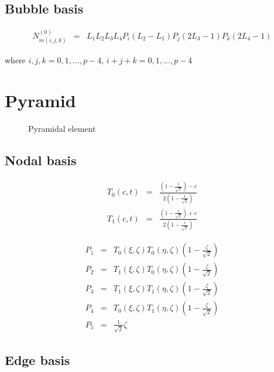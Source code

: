 \subsection{Bubble basis}

\begin{eqnarray*}
N_{m(i,j,k)}^{(0)}&=&L_1L_2L_3L_4P_i(L_2-L_1)P_j(2L_3-1)P_k(2L_4-1)
\end{eqnarray*}

\noindent where $i,j,k=0,1,\ldots,p-4$, $i+j+k=0,1,\ldots,p-4$ 

\section{Pyramid}

\begin{figure}[tbhp]
\begin{center}

\caption{Pyramidal element}
\end{center}
\end{figure}

\subsection{Nodal basis}

\begin{eqnarray*}
T_0(c,t)&=&\frac{(1-\frac{t}{\sqrt{2}})-c}{2(1-\frac{t}{\sqrt{2}})} \\
T_1(c,t)&=&\frac{(1-\frac{t}{\sqrt{2}})+c}{2(1-\frac{t}{\sqrt{2}})}
\end{eqnarray*}

\begin{eqnarray*}
P_1&=&T_0(\xi,\zeta)T_0(\eta,\zeta)(1-\frac{\zeta}{\sqrt{2}}) \\
P_2&=&T_1(\xi,\zeta)T_0(\eta,\zeta)(1-\frac{\zeta}{\sqrt{2}}) \\
P_3&=&T_1(\xi,\zeta)T_1(\eta,\zeta)(1-\frac{\zeta}{\sqrt{2}}) \\
P_4&=&T_0(\xi,\zeta)T_1(\eta,\zeta)(1-\frac{\zeta}{\sqrt{2}}) \\
P_5&=&\frac{1}{\sqrt{2}}\zeta 
\end{eqnarray*}

\subsection{Edge basis}

